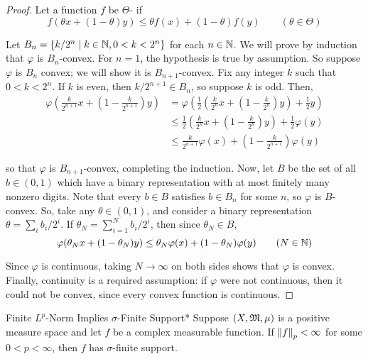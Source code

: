 \begin{proof}
    Let a function \(f\) be \(\Theta\)- if 
    \[
        f(\theta x + (1 - \theta) y) \leq \theta f(x) + (1 - \theta) f(y) 
        \qquad (\theta \in \Theta)
    \]

    Let \(B_n = \{k / 2^n \mid k \in \mathbb{N}, 0 < k < 2^n\}\) for each \(n \in \mathbb{N}\). We will prove by induction that \(\varphi\) is \(B_n\)-convex. For \(n=1\), the hypothesis is true by assumption. So suppose \(\varphi\) is \(B_n\) convex; we will show it is \(B_{n+1}\)-convex. Fix any integer \(k\) such that \(0 < k < 2^n\). If \(k\) is even, then \(k/2^{n+1} \in B_n\), so suppose \(k\) is odd. Then, 
    \begin{align*}
        \varphi \left( \frac{k}{2^{n+1}} x + \left(1 - \frac{k}{2^{n+1}}\right) y \right)
        &= \varphi \left( \frac{1}{2} \left( \frac{k}{2^n} x + \left(1 - \frac{k}{2^n}\right) y \right) + \frac{1}{2} y \right) \\
        &\leq \frac{1}{2} \left( \frac{k}{2^n} x + \left( 1 - \frac{k}{2^n} \right) y \right) + \frac{1}{2} \varphi(y) \\
        &\leq \frac{k}{2^{n+1}} \varphi(x) + \left(1 - \frac{k}{2^{n+1}} \right) \varphi(y)
    \end{align*}

    so that \(\varphi\) is \(B_{n+1}\)-convex, completing the induction. Now, let \(B\) be the set of all \(b \in (0, 1)\) which have a binary representation with at most finitely many nonzero digits. Note that every \(b \in B\) satisfies \(b \in B_n\) for some \(n\), so \(\varphi\) is \(B\)-convex. So, take any \(\theta \in (0, 1)\), and consider a binary representation \(\theta = \sum_i b_i / 2^i\). If \(\theta_N = \sum_{i=1}^N b_i / 2^i\), then since \(\theta_N \in B\), 
    \[
        \varphi(\theta_N x + (1 - \theta_N) y) \leq \theta_N \varphi(x) + (1 - \theta_N) \varphi(y)
        \qquad (N \in \mathbb{N})
    \]

    Since \(\varphi\) is continuous, taking \(N \to \infty\) on both sides shows that \(\varphi\) is convex. Finally, continuity is a required assumption: if \(\varphi\) were not continuous, then it could not be convex, since every convex function is continuous. 
\end{proof}


\begin{problem}{Finite \(L^p\)-Norm Implies \(\sigma\)-Finite Support}*
    Suppose \((X, \mathfrak{M}, \mu)\) is a positive measure space and let \(f\) be a complex measurable function. If \(\norm{f}_p < \infty\) for some \(0 < p < \infty\), then \(f\) has \(\sigma\)-finite support. 
\end{problem}

